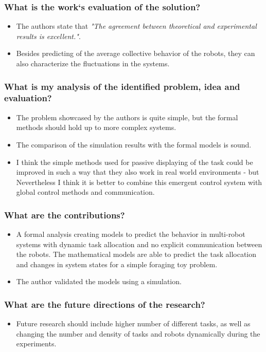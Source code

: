 \subsubsection*{What is the work`s evaluation of the solution?}
\begin{itemize}
    \item The authors state that \emph{"The agreement between theoretical and experimental results is excellent."}. 
    \item Besides predicting of the average collective behavior of the robots, they can also characterize the fluctuations in the systems.
\end{itemize}
\subsubsection*{What is my analysis of the identified problem, idea and evaluation?}
\begin{itemize}
    \item The problem showcased by the authors is quite simple, but the formal methods should hold up to more complex systems.
    \item The comparison of the simulation results with the formal models is sound. 
    \item I think the simple methods used for passive displaying of the task could be improved in such a way that they also work in real world environments - but Nevertheless I think it is better to combine this emergent control system with  global control methods and communication.
\end{itemize}
\subsubsection*{What are the contributions?}
\begin{itemize}
    \item A formal analysis creating models to predict the behavior in multi-robot systems with dynamic task allocation and no explicit communication between the robots. The mathematical models are able to predict the task allocation and changes in system states for a simple foraging toy problem.
    \item The author validated the models using a simulation.
\end{itemize}
\subsubsection*{What are the future directions of the research?}
\begin{itemize}
    \item Future research should include higher number of different tasks, as well as changing the number and density of tasks and robots dynamically during the experiments.
\end{itemize}
